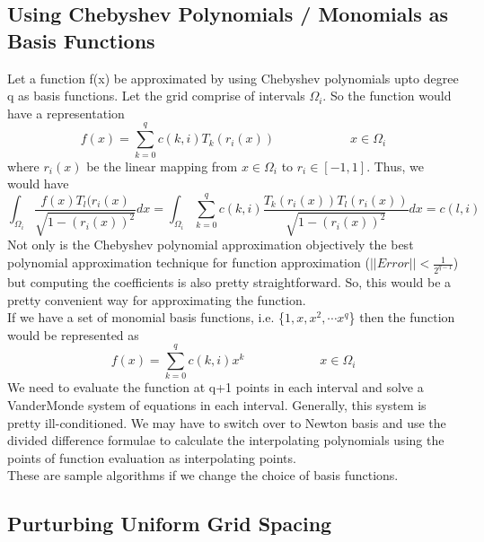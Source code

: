 \documentclass{article}
\begin{document}
\subsection{Using Chebyshev Polynomials / Monomials as Basis Functions}
Let a function f(x) be approximated by using Chebyshev polynomials upto degree q as basis functions. Let the grid comprise of intervals $\Omega_{i}$. So the function would have a representation
\begin{equation}
    f(x) = \sum_{k=0}^{q} c(k,i) T_{k}(r_{i}(x)) \hspace{1in} x \in \Omega_{i}
\end{equation}
where $r_{i}(x)$ be the linear mapping from $x \in \Omega_{i}$ to $r_{i} \in [-1,1]$. Thus, we would have
\begin{equation}
    \int_{\Omega_{i}} \frac{f(x) T_{l}(r_{i}(x)}{\sqrt{1 - (r_{i}(x))^{2}}} dx = \int_{\Omega_{i}} \sum_{k=0}^{q} c(k,i) \frac{T_{k}(r_{i}(x)) T_{l}(r_{i}(x))}{\sqrt{1 - (r_{i}(x))^{2}}} dx = c(l,i)
\end{equation}
Not only is the Chebyshev polynomial approximation objectively the best polynomial approximation technique for function approximation ($||Error|| < \frac{1}{2^{q-1}}$) but computing the coefficients is also pretty straightforward. So, this would be a pretty convenient way for approximating the function.\\

If we have a set of monomial basis functions, i.e. \{$1, x, x^{2}, \cdots x^{q}$\} then the function would be represented as 
\begin{equation}
    f(x) =  \sum_{k=0}^{q} c(k,i) x^{k} \hspace{1in} x \in \Omega_{i}
\end{equation}
We need to evaluate the function at q+1 points in each interval and solve a VanderMonde system of equations in each interval. Generally, this system is pretty ill-conditioned. We may have to switch over to Newton basis and use the divided difference formulae to calculate the interpolating polynomials using the points of function evaluation as interpolating points.\\

These are sample algorithms if we change the choice of basis functions.

\subsection{Purturbing Uniform Grid Spacing}
\end{document}
